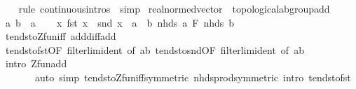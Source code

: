 \begin{isabellebody}
%
\isadelimproof
\ \ %
\endisadelimproof
%
\isatagproof
{}\isamarkupfalse%
\ {\isacharparenleft}{\kern0pt}rule\ continuous{\isacharunderscore}{\kern0pt}intros\ {\isacharbar}{\kern0pt}\ simp{\isacharparenright}{\kern0pt}{\isacharplus}{\kern0pt}%
\endisatagproof
{\isafoldproof}%
%
\isadelimproof
\isanewline
%
\endisadelimproof
\isanewline
{}\isamarkupfalse%
\ real{\isacharunderscore}{\kern0pt}normed{\isacharunderscore}{\kern0pt}vector\ {\isacharless}{\kern0pt}\ topological{\isacharunderscore}{\kern0pt}ab{\isacharunderscore}{\kern0pt}group{\isacharunderscore}{\kern0pt}add\isanewline
%
\isadelimproof
%
\endisadelimproof
%
\isatagproof
{}\isamarkupfalse%
\isanewline
\ \ \isamarkupfalse%
\ a\ b\ {\isacharcolon}{\kern0pt}{\isacharcolon}{\kern0pt}\ {\isacharprime}{\kern0pt}a\isanewline
\ \ \isamarkupfalse%
\ {\isachardoublequoteopen}{\isacharparenleft}{\kern0pt}{\isacharparenleft}{\kern0pt}{\isasymlambda}x{\isachardot}{\kern0pt}\ fst\ x\ {\isacharplus}{\kern0pt}\ snd\ x{\isacharparenright}{\kern0pt}\ {\isasymlonglongrightarrow}\ a\ {\isacharplus}{\kern0pt}\ b{\isacharparenright}{\kern0pt}\ {\isacharparenleft}{\kern0pt}nhds\ a\ {\isasymtimes}\isactrlsub F\ nhds\ b{\isacharparenright}{\kern0pt}{\isachardoublequoteclose}\isanewline
\ \ \ \ \isamarkupfalse%
\ tendsto{\isacharunderscore}{\kern0pt}Zfun{\isacharunderscore}{\kern0pt}iff\ add{\isacharunderscore}{\kern0pt}diff{\isacharunderscore}{\kern0pt}add\isanewline
\ \ \ \ \isamarkupfalse%
\ tendsto{\isacharunderscore}{\kern0pt}fst{\isacharbrackleft}{\kern0pt}OF\ filterlim{\isacharunderscore}{\kern0pt}ident{\isacharcomma}{\kern0pt}\ of\ {\isachardoublequoteopen}{\isacharparenleft}{\kern0pt}a{\isacharcomma}{\kern0pt}b{\isacharparenright}{\kern0pt}{\isachardoublequoteclose}{\isacharbrackright}{\kern0pt}\ tendsto{\isacharunderscore}{\kern0pt}snd{\isacharbrackleft}{\kern0pt}OF\ filterlim{\isacharunderscore}{\kern0pt}ident{\isacharcomma}{\kern0pt}\ of\ {\isachardoublequoteopen}{\isacharparenleft}{\kern0pt}a{\isacharcomma}{\kern0pt}b{\isacharparenright}{\kern0pt}{\isachardoublequoteclose}{\isacharbrackright}{\kern0pt}\isanewline
\ \ \ \ \isamarkupfalse%
\ {\isacharparenleft}{\kern0pt}intro\ Zfun{\isacharunderscore}{\kern0pt}add{\isacharparenright}{\kern0pt}\isanewline
\ \ \ \ \ \ \ {\isacharparenleft}{\kern0pt}auto\ simp{\isacharcolon}{\kern0pt}\ tendsto{\isacharunderscore}{\kern0pt}Zfun{\isacharunderscore}{\kern0pt}iff{\isacharbrackleft}{\kern0pt}symmetric{\isacharbrackright}{\kern0pt}\ nhds{\isacharunderscore}{\kern0pt}prod{\isacharbrackleft}{\kern0pt}symmetric{\isacharbrackright}{\kern0pt}\ intro{\isacharbang}{\kern0pt}{\isacharcolon}{\kern0pt}\ tendsto{\isacharunderscore}{\kern0pt}fst{\isacharparenright}{\kern0pt}\isanewline

\end{isabellebody}
